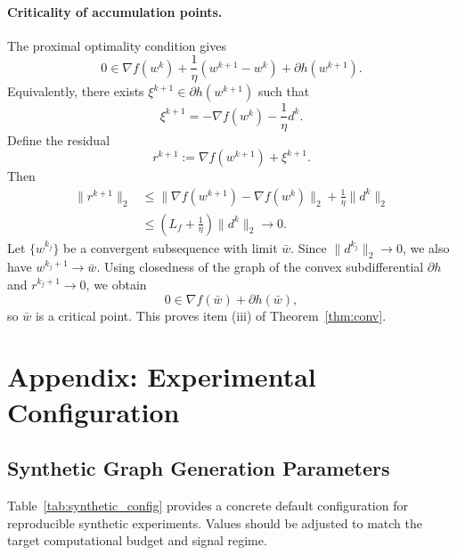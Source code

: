 \documentclass[10pt,twocolumn,letterpaper]{article}
\theoremstyle{definition}
\begin{document}
\paragraph{Criticality of accumulation points.}
The proximal optimality condition gives
\begin{equation}
0 \in \nabla f(w^k) + \frac{1}{\eta}(w^{k+1}-w^k) + \partial h(w^{k+1}).
\label{eq:prox_first_order_appendix}
\end{equation}
Equivalently, there exists $\xi^{k+1}\in \partial h(w^{k+1})$ such that
\begin{equation}
\xi^{k+1} = -\nabla f(w^k) - \frac{1}{\eta}d^k.
\end{equation}
Define the residual
\begin{equation}
r^{k+1}:=\nabla f(w^{k+1})+\xi^{k+1}.
\end{equation}
Then
\begin{equation}
\begin{aligned}
\|r^{k+1}\|_2
&\le \|\nabla f(w^{k+1})-\nabla f(w^k)\|_2 + \frac{1}{\eta}\|d^k\|_2 \\
&\le \left(L_f+\frac{1}{\eta}\right)\|d^k\|_2 \to 0.
\end{aligned}
\end{equation}
Let $\{w^{k_j}\}$ be a convergent subsequence with limit $\bar w$. Since $\|d^{k_j}\|_2\to 0$, we also have $w^{k_j+1}\to \bar w$. Using closedness of the graph of the convex subdifferential $\partial h$ and $r^{k_j+1}\to 0$, we obtain
\begin{equation}
0\in \nabla f(\bar w)+\partial h(\bar w),
\end{equation}
so $\bar w$ is a critical point. This proves item (iii) of Theorem~\ref{thm:conv}.

\section{Appendix: Experimental Configuration}
\subsection{Synthetic Graph Generation Parameters}
Table~\ref{tab:synthetic_config} provides a concrete default configuration for reproducible synthetic experiments. Values should be adjusted to match the target computational budget and signal regime.
\end{document}
